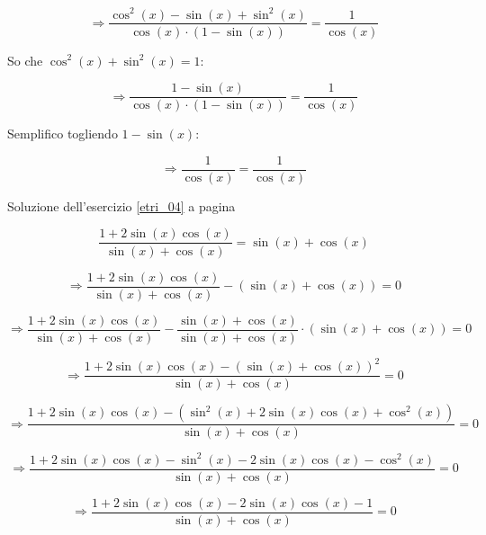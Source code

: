 \begin{minipage}{\textwidth}
\begin{equation*}
\Rightarrow
\frac{
\cos^2(x)-\sin(x)+\sin^2(x)}
{
\cos(x)\cdot
\left(1-\sin(x)\right)
} 
= \frac{1}{\cos(x)}
\end{equation*}

So che $\cos^2(x)+\sin^2(x)=1$:

\begin{equation*}
\Rightarrow
\frac{
1-\sin(x)
}{
\cos(x)\cdot
\left(1-\sin(x)\right)
} 
= \frac{1}{\cos(x)}
\end{equation*}

Semplifico togliendo $1-\sin(x)$:


\begin{equation*}
\Rightarrow
\frac{
1
}{
\cos(x)
} 
= \frac{1}{\cos(x)}
\end{equation*}

\end{minipage}
Soluzione dell'esercizio \ref{etri_04} a pagina \pageref{etri_04}\label{stri_04}

\begin{equation*}
\frac{
1+2\sin(x)\cos(x)
}{
\sin(x)+\cos(x)
}
=
\sin(x)+\cos(x)
\end{equation*}


\begin{equation*}
\Rightarrow
\frac{
1+2\sin(x)\cos(x)
}{
\sin(x)+\cos(x)
}
-(\sin(x)+\cos(x))
=
0
\end{equation*}

\begin{equation*}
\Rightarrow
\frac{
1+2\sin(x)\cos(x)
}{
\sin(x)+\cos(x)
}
-\frac{
\sin(x)+\cos(x)
}{
\sin(x)+\cos(x)
}\cdot(\sin(x)+\cos(x))
=
0
\end{equation*}


\begin{equation*}
\Rightarrow
\frac{
1+2\sin(x)\cos(x)
-(
\sin(x)+\cos(x)
)^2
}{
\sin(x)+\cos(x)
}
=
0
\end{equation*}


\begin{equation*}
\Rightarrow
\frac{
1+2\sin(x)\cos(x)
-(
\sin^2(x)+2\sin(x)\cos(x)+\cos^2(x)
)
}{
\sin(x)+\cos(x)
}
=
0
\end{equation*}


\begin{equation*}
\Rightarrow
\frac{
1+2\sin(x)\cos(x)
-\sin^2(x)-2\sin(x)\cos(x)-\cos^2(x)
}{
\sin(x)+\cos(x)
}
=
0
\end{equation*}


\begin{equation*}
\Rightarrow
\frac{
1+2\sin(x)\cos(x)-2\sin(x)\cos(x)-1
}{
\sin(x)+\cos(x)
}
=
0
\end{equation*}



